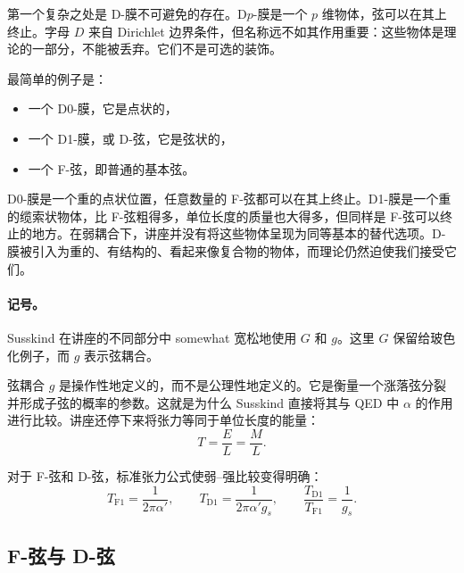 第一个复杂之处是 D-膜不可避免的存在。D\(p\)-膜是一个 \(p\) 维物体，弦可以在其上终止。字母 \(D\) 来自 Dirichlet 边界条件，但名称远不如其作用重要：这些物体是理论的一部分，不能被丢弃。它们不是可选的装饰。

最简单的例子是：
\begin{itemize}
\item 一个 D0-膜，它是点状的，
\item 一个 D1-膜，或 D-弦，它是弦状的，
\item 一个 F-弦，即普通的基本弦。
\end{itemize}
D0-膜是一个重的点状位置，任意数量的 F-弦都可以在其上终止。D1-膜是一个重的缆索状物体，比 F-弦粗得多，单位长度的质量也大得多，但同样是 F-弦可以终止的地方。在弱耦合下，讲座并没有将这些物体呈现为同等基本的替代选项。D-膜被引入为重的、有结构的、看起来像复合物的物体，而理论仍然迫使我们接受它们。


\paragraph{记号。}
Susskind 在讲座的不同部分中 somewhat 宽松地使用 \(G\) 和 \(g\)。这里 \(G\) 保留给玻色化例子，而 \(g\) 表示弦耦合。

弦耦合 \(g\) 是操作性地定义的，而不是公理性地定义的。它是衡量一个涨落弦分裂并形成子弦的概率的参数。这就是为什么 Susskind 直接将其与 QED 中 \(\alpha\) 的作用进行比较。讲座还停下来将张力等同于单位长度的能量：
\begin{equation}
T=\frac{E}{L}=\frac{M}{L}.
\end{equation}

对于 F-弦和 D-弦，标准张力公式使弱--强比较变得明确：
\begin{equation}
T_{\mathrm{F1}}=\frac{1}{2\pi\alpha'},
\qquad
T_{\mathrm{D1}}=\frac{1}{2\pi\alpha' g_s},
\qquad
\frac{T_{\mathrm{D1}}}{T_{\mathrm{F1}}}=\frac{1}{g_s}.
\end{equation}

\subsection{F-弦与 D-弦}

